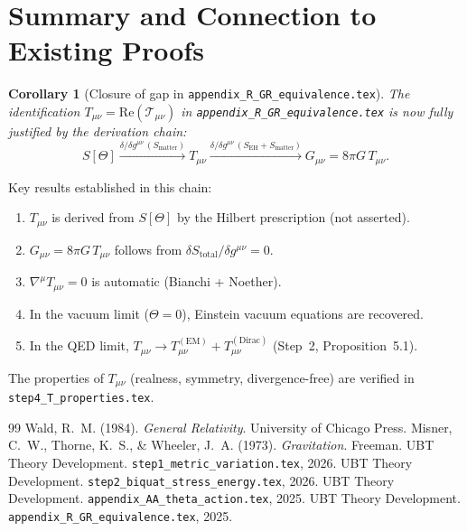 \documentclass[12pt]{article}
\newtheorem{corollary}[definition]{Corollary}
\newcommand{\re}{\mathrm{Re}}
\begin{document}
\section{Summary and Connection to Existing Proofs}

\begin{corollary}[Closure of gap in \texttt{appendix\_R\_GR\_equivalence.tex}]
  \label{cor:gap_closed}
  The identification $T_{\mu\nu} = \re(\mathcal{T}_{\mu\nu})$ in
  \texttt{appendix\_R\_GR\_equivalence.tex} is now fully justified by the
  derivation chain:
  \begin{equation}
    S[\Theta]
    \xrightarrow{\delta/\delta g^{\mu\nu}\,(S_{\mathrm{matter}})}
    T_{\mu\nu}
    \xrightarrow{\delta/\delta g^{\mu\nu}\,(S_{\mathrm{EH}} + S_{\mathrm{matter}})}
    G_{\mu\nu} = 8\pi G\,T_{\mu\nu}.
  \end{equation}
\end{corollary}

Key results established in this chain:
\begin{enumerate}
  \item $T_{\mu\nu}$ is derived from $S[\Theta]$ by the Hilbert prescription
        (not asserted).
  \item $G_{\mu\nu} = 8\pi G\,T_{\mu\nu}$ follows from
        $\delta S_{\mathrm{total}}/\delta g^{\mu\nu} = 0$.
  \item $\nabla^\mu T_{\mu\nu} = 0$ is automatic (Bianchi + Noether).
  \item In the vacuum limit ($\Theta=0$), Einstein vacuum equations are
        recovered.
  \item In the QED limit, $T_{\mu\nu} \to T^{(\mathrm{EM})}_{\mu\nu}
        + T^{(\mathrm{Dirac})}_{\mu\nu}$ (Step~2, Proposition~5.1).
\end{enumerate}

The properties of $T_{\mu\nu}$ (realness, symmetry, divergence-free) are
verified in \texttt{step4\_T\_properties.tex}.

\begin{thebibliography}{99}
    Wald, R.~M. (1984). \textit{General Relativity}.
                  University of Chicago Press.
  Misner, C.~W., Thorne, K.~S., \& Wheeler, J.~A. (1973).
                  \textit{Gravitation}. Freeman.
   UBT Theory Development.
                  \texttt{step1\_metric\_variation.tex}, 2026.
   UBT Theory Development.
                  \texttt{step2\_biquat\_stress\_energy.tex}, 2026.
                  UBT Theory Development.
                  \texttt{appendix\_AA\_theta\_action.tex}, 2025.
                  UBT Theory Development.
                  \texttt{appendix\_R\_GR\_equivalence.tex}, 2025.
\end{thebibliography}
\end{document}
